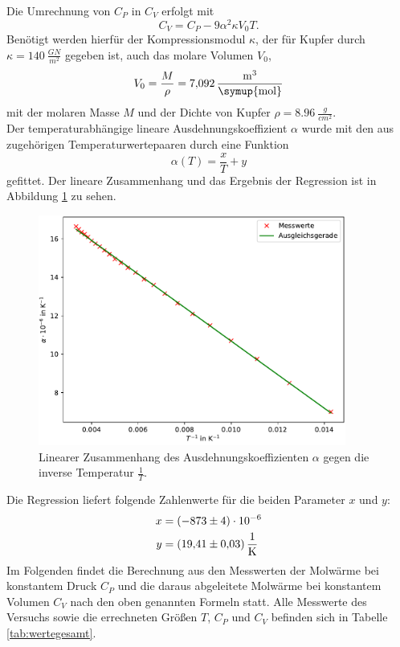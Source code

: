 Die Umrechnung von $C_P$ in $C_V$ erfolgt mit
\begin{equation}
  C_V = C_P-9\alpha ^2 \kappa V_0 T.
\end{equation}
Benötigt werden hierfür der Kompressionsmodul $\kappa$, der für Kupfer durch $\kappa= \SI{140}{\frac{GN}{m^2}}$ gegeben ist, auch das molare Volumen $V_0$,
\begin{equation}
	V_0=\frac{M}{\rho}=\SI{7,092}{\frac{m^3}{\symup{mol}}}
\end{equation}
mit der molaren Masse $M$ und der Dichte von Kupfer $\rho=\SI{8,96}{\frac{g}{cm^2}}$\cite{molaremassecu}.\\
Der temperaturabhängige lineare Ausdehnungskoeffizient $\alpha$ wurde mit den aus \cite{anleitung} zugehörigen Temperaturwertepaaren durch eine Funktion
\begin{equation}
	\alpha(T)=\frac{x}{T}+y
\end{equation}
gefittet. Der lineare Zusammenhang und das Ergebnis der Regression ist in Abbildung \ref{fig:alphaplot} zu sehen.

\begin{figure}[H]
  \centering
  \includegraphics[width=0.9\textwidth]{plots/alphaplot.pdf}
  \caption{Linearer Zusammenhang des Ausdehnungskoeffizienten $\alpha$ gegen die inverse Temperatur $\frac{1}{T}$.}
  \label{fig:alphaplot}
\end{figure}

Die Regression liefert folgende Zahlenwerte für die beiden Parameter $x$ und $y$:
\begin{align*}
	x &=(-873 \pm 4)\cdot 10^{-6}\\
	y &=\SI{19,41 \pm 0,03}{\frac{1}{K}}
\end{align*}
Im Folgenden findet die Berechnung aus den Messwerten der Molwärme bei konstantem Druck $C_P$ und die daraus abgeleitete Molwärme bei konstantem Volumen $C_V$
nach den oben genannten Formeln statt. Alle Messwerte des Versuchs sowie die errechneten Größen $T$, $C_P$ und $C_V$ befinden sich in Tabelle \ref{tab:wertegesamt}.



